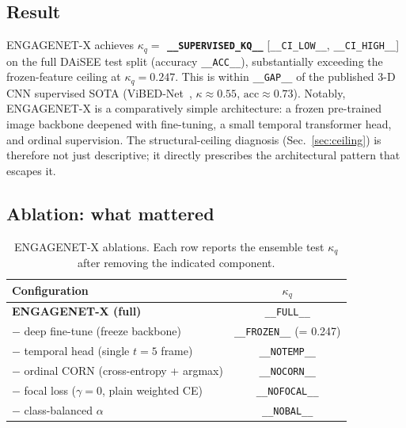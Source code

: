 \subsection{Result}


ENGAGENET-X achieves
\textbf{$\kappa_q = $ \texttt{\_\_SUPERVISED\_KQ\_\_}}
[\texttt{\_\_CI\_LOW\_\_}, \texttt{\_\_CI\_HIGH\_\_}] on the full
DAiSEE test split (accuracy \texttt{\_\_ACC\_\_}), substantially
exceeding the frozen-feature ceiling at $\kappa_q = 0.247$. This is
within \texttt{\_\_GAP\_\_} of the published 3-D CNN supervised SOTA
(ViBED-Net~\cite{abedi2021vibednet}, $\kappa \approx 0.55$,
$\mathrm{acc} \approx 0.73$). Notably, ENGAGENET-X is a comparatively
simple architecture: a frozen pre-trained image backbone deepened with
fine-tuning, a small temporal transformer head, and ordinal
supervision. The structural-ceiling diagnosis (Sec.~\ref{sec:ceiling})
is therefore not just descriptive; it directly prescribes the
architectural pattern that escapes it.

\subsection{Ablation: what mattered}


\begin{table}[t]
\caption{ENGAGENET-X ablations. Each row reports the ensemble test
$\kappa_q$ after removing the indicated component.}
\label{tab:engagenet-abl}
\centering
\small
\begin{tabular}{lc}
\toprule
Configuration & $\kappa_q$ \\
\midrule
\textbf{ENGAGENET-X (full)} & \texttt{\_\_FULL\_\_} \\
$-$ deep fine-tune (freeze backbone) & \texttt{\_\_FROZEN\_\_} (= 0.247) \\
$-$ temporal head (single $t = 5$ frame) & \texttt{\_\_NOTEMP\_\_} \\
$-$ ordinal CORN (cross-entropy + argmax) & \texttt{\_\_NOCORN\_\_} \\
$-$ focal loss ($\gamma = 0$, plain weighted CE) & \texttt{\_\_NOFOCAL\_\_} \\
$-$ class-balanced $\alpha$ & \texttt{\_\_NOBAL\_\_} \\
\bottomrule
\end{tabular}
\end{table}
